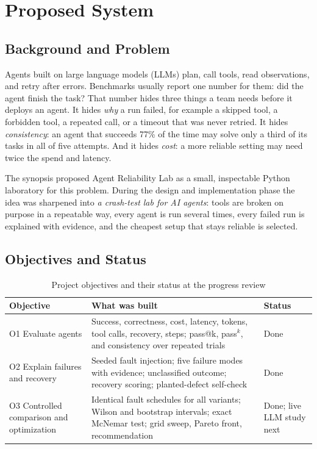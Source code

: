 \documentclass[12pt,a4paper,oneside]{report}
\begin{document}
\begin{singlespace}
\tableofcontents
\listoffigures
\listoftables
\end{singlespace}
\clearpage
{}

\chapter{Proposed System}

\section{Background and Problem}
Agents built on large language models (LLMs) plan, call tools, read observations, and
retry after errors. Benchmarks usually report one number for them: did the agent finish
the task? That number hides three things a team needs before it deploys an agent. It
hides \emph{why} a run failed, for example a skipped tool, a forbidden tool, a repeated
call, or a timeout that was never retried. It hides \emph{consistency}: an agent that
succeeds 77\% of the time may solve only a third of its tasks in all of five attempts.
And it hides \emph{cost}: a more reliable setting may need twice the spend and latency.

The synopsis proposed Agent Reliability Lab as a small, inspectable Python laboratory for
this problem. During the design and implementation phase the idea was sharpened into
\emph{a crash-test lab for AI agents}: tools are broken on purpose in a repeatable way,
every agent is run several times, every failed run is explained with evidence, and the
cheapest setup that stays reliable is selected.

\section{Objectives and Status}
\begin{table}[H]
\centering
\caption{Project objectives and their status at the progress review}
\begin{tabularx}{\linewidth}{p{3.3cm}Yp{2.5cm}}
\toprule
\textbf{Objective} & \textbf{What was built} & \textbf{Status} \\
\midrule
O1 Evaluate agents & Success, correctness, cost, latency, tokens, tool calls, recovery, steps; pass@k, pass$^k$, and consistency over repeated trials & Done \\
O2 Explain failures and recovery & Seeded fault injection; five failure modes with evidence; unclassified outcome; recovery scoring; planted-defect self-check & Done \\
O3 Controlled comparison and optimization & Identical fault schedules for all variants; Wilson and bootstrap intervals; exact McNemar test; grid sweep, Pareto front, recommendation & Done; live LLM study next \\
\bottomrule
\end{tabularx}
\end{table}
\end{document}
